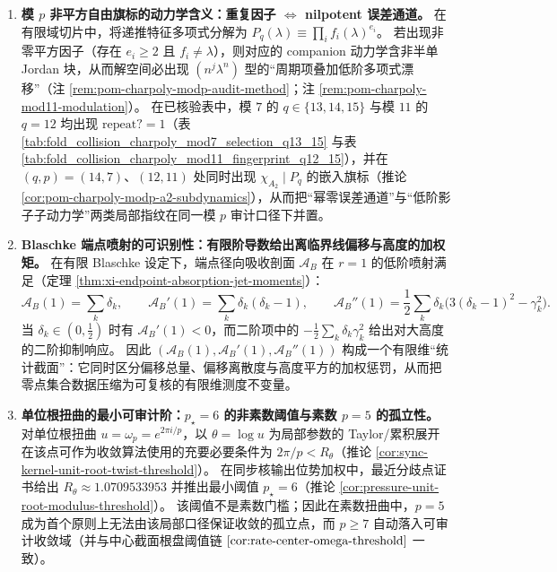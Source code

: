 \begin{enumerate}
  \item \textbf{模 \texorpdfstring{$p$}{p} 非平方自由旗标的动力学含义：重复因子 \texorpdfstring{$\Leftrightarrow$}{<->} nilpotent 误差通道。}
  在有限域切片中，将递推特征多项式分解为
  \(P_q(\lambda)\equiv\prod_i f_i(\lambda)^{e_i}\)。
  若出现非零平方因子（存在 \(e_i\ge 2\) 且 \(f_i\neq\lambda\)），则对应的 companion 动力学含非半单 Jordan 块，从而解空间必出现 \((n^j\lambda^n)\) 型的“周期项叠加低阶多项式漂移”（注 \ref{rem:pom-charpoly-modp-audit-method}；注 \ref{rem:pom-charpoly-mod11-modulation}）。
  在已核验表中，模 \(7\) 的 \(q\in\{13,14,15\}\) 与模 \(11\) 的 \(q=12\) 均出现 \(\mathrm{repeat?}=1\)（表 \ref{tab:fold_collision_charpoly_mod7_selection_q13_15} 与表 \ref{tab:fold_collision_charpoly_mod11_fingerprint_q12_15}），并在 \((q,p)=(14,7)\)、\((12,11)\) 处同时出现 \(\chi_{A_2}\mid P_q\) 的嵌入旗标（推论 \ref{cor:pom-charpoly-modp-a2-subdynamics}），从而把“幂零误差通道”与“低阶影子子动力学”两类局部指纹在同一模 \(p\) 审计口径下并置。

  \item \textbf{Blaschke 端点喷射的可识别性：有限阶导数给出离临界线偏移与高度的加权矩。}
  在有限 Blaschke 设定下，端点径向吸收剖面 \(\mathcal{A}_B\) 在 \(r=1\) 的低阶喷射满足（定理 \ref{thm:xi-endpoint-absorption-jet-moments}）：
  \[
  \mathcal{A}_B(1)=\sum_k \delta_k,\qquad
  \mathcal{A}_B'(1)=\sum_k \delta_k(\delta_k-1),\qquad
  \mathcal{A}_B''(1)=\frac12\sum_k \delta_k\bigl(3(\delta_k-1)^2-\gamma_k^2\bigr).
  \]
  当 \(\delta_k\in(0,\tfrac12)\) 时有 \(\mathcal{A}_B'(1)<0\)，而二阶项中的 \(-\tfrac12\sum_k\delta_k\gamma_k^2\) 给出对大高度的二阶抑制响应。
  因此 \((\mathcal{A}_B(1),\mathcal{A}_B'(1),\mathcal{A}_B''(1))\) 构成一个有限维“统计截面”：它同时区分偏移总量、偏移离散度与高度平方的加权惩罚，从而把零点集合数据压缩为可复核的有限维测度不变量。

  \item \textbf{单位根扭曲的最小可审计阶：\texorpdfstring{$p_\star=6$}{p*=6} 的非素数阈值与素数 \texorpdfstring{$p=5$}{p=5} 的孤立性。}
  对单位根扭曲 \(u=\omega_p=e^{2\pi i/p}\)，以 \(\theta=\log u\) 为局部参数的 Taylor/累积展开在该点可作为收敛算法使用的充要必要条件为 \(2\pi/p<R_\theta\)（推论 \ref{cor:sync-kernel-unit-root-twist-threshold}）。
  在同步核输出位势加权中，最近分歧点证书给出 \(R_\theta\approx 1.0709533953\) 并推出最小阈值 \(p_\star=6\)（推论 \ref{cor:pressure-unit-root-modulus-threshold}）。
  该阈值不是素数门槛；因此在素数扭曲中，\(p=5\) 成为首个原则上无法由该局部口径保证收敛的孤立点，而 \(p\ge 7\) 自动落入可审计收敛域（并与中心截面根盘阈值链 \(\ref{cor:rate-center-omega-threshold}\) 一致）。
\end{enumerate}

